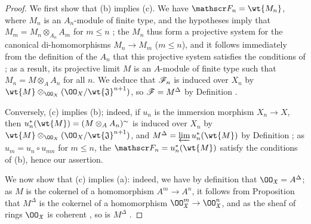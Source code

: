 \begin{proof}
\label{proof-1.10.10.5}
We first show that (b) implies (c).
We have $\sh{F}_n=\wt{M_n}$, where $M_n$ is an $A_n$-module of finite type, and the hypotheses imply that $M_m=M_n\otimes_{A_n}A_m$ for $m\leq n$ ; the $M_n$ thus form a projective system for the canonical di-homomorphisms $M_n\to M_m$ ($m\leq n$), and it follows immediately from the definition of the $A_n$ that this projective system satisfies the conditions of ; as a result, its projective limit $M$ is an $A$-module of finite type such that $M_n=M\otimes_A A_n$ for all $n$.
We deduce that $\mathscr{F}_n$ is induced over $X_n$ by $\wt{M}\otimes_{\OO_X}(\OO_X/\wt{\mathfrak{J}}^{n+1})$, so $\mathscr{F}=M^\Delta$ by Definition .

Conversely, (c) implies (b); indeed, if $u_n$ is the immersion morphism $X_n\to X$, then $u_n^*(\wt{M})=(M\otimes_A A_n)^\sim$ is induced over $X_n$ by $\wt{M}\otimes_{\OO_X}(\OO_X/\wt{\mathfrak{J}}^{n+1})$, and $M^\Delta=\varprojlim u_n^*(\wt{M})$ by Definition ; as $u_m=u_n\circ u_{mn}$ for $m\leq n$, the $\sh{F}_n=u_n^*(\wt{M})$ satisfy the conditions of (b), hence our assertion.

We now show that (c) implies (a): indeed, we have by definition that $\OO_\mathfrak{X}=A^\Delta$; as $M$ is the cokernel of a homomorphism $A^m\to A^n$, it follows from Proposition  that $M^\Delta$ is the cokernel of a homomorphism $\OO_\mathfrak{X}^m\to\OO_\mathfrak{X}^n$, and as the sheaf of rings $\OO_\mathfrak{X}$ is coherent , so is $M^\Delta$ .


\end{proof}
